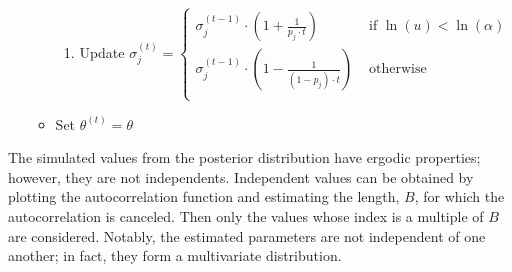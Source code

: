 \documentclass[11pt,fleqn]{book} %
\begin{document}
\begin{algorithm}
\begin{enumerate}
\begin{itemize}
\begin{enumerate}[label=\alph*.]
				\item Update $\sigma_j^{(t)} = \left\{
					\begin{array}{ll}
						\sigma_j^{(t-1)} \cdot \left( 1 + \frac{1}{p_j \cdot t} \right) & \text{ if } \ln(u) < \ln(\alpha) \\
						\sigma_j^{(t-1)} \cdot \left( 1 - \frac{1}{(1-p_j) \cdot t} \right) & \text{ otherwise } \\
					\end{array}
				\right.$
			\end{enumerate}
			\item Set $\theta^{(t)}=\theta$
		\end{itemize}
	\end{enumerate}
\end{algorithm}

The simulated values from the posterior distribution have ergodic properties;
however, they are not independents. Independent values can be obtained by 
plotting the autocorrelation function and estimating the length, $B$, for 
which the autocorrelation is canceled. Then only the values whose index is a 
multiple of $B$ are considered. Notably, the estimated parameters are not 
independent of one another; in fact, they form a multivariate distribution.
\end{document}
